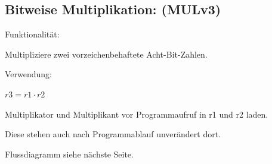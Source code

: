 \documentclass[fleqn, a4paper, 11pt]{article}       %
\begin{document}
\subsection{Bitweise Multiplikation: (MULv3)\label{A.MULv3}}
Funktionalität:

Multipliziere zwei vorzeichenbehaftete Acht-Bit-Zahlen.
\vspace{0.25cm}

\noindent Verwendung:
\begin{compactitem}
	\item $r3 = r1 \cdot r2$
	\item Multiplikator und Multiplikant vor Programmaufruf in r1 und r2 laden.
	\item Diese stehen auch nach Programmablauf unverändert                dort.
\end{compactitem}
\vspace{0.25cm}
\noindent Flussdiagramm siehe nächste Seite.




\thispagestyle{empty}


\thispagestyle{empty}






\newpage

\printbibliography  %
\end{document}
